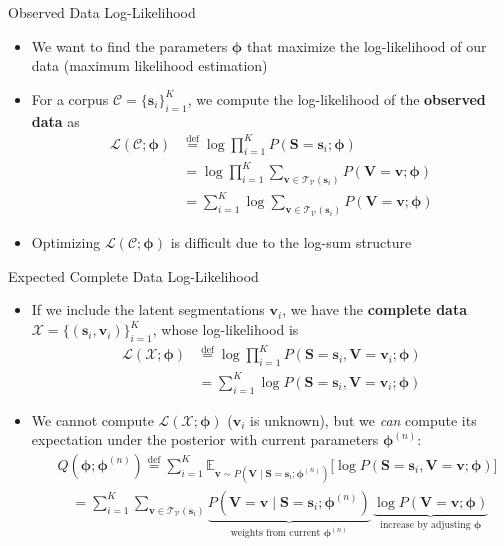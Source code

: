 \documentclass[11pt,compress,t,notes=noshow, xcolor=table]{beamer}
\newcommand{\vocab}{\mathcal{V}}
\newcommand{\probs}{\boldsymbol{\phi}}
\begin{document}
\begin{frame}{Observed Data Log-Likelihood}
\begin{itemize}
\item We want to find the parameters $\probs$ that maximize the log-likelihood of our data (maximum likelihood estimation)
\item For a corpus $\mathcal{C} = \{ \mathbf{s}_i \}_{i=1}^K$, we compute the log-likelihood of the \textbf{observed data} as
\begin{align*}
\mathcal{L}(\mathcal{C}; \probs) &\overset{\text{def}}{=} \log \prod_{i=1}^{K} P(\mathbf{S} = \mathbf{s}_i; \probs)\\
&= \log \prod_{i=1}^{K} \sum_{\mathbf{v} \in \mathcal{T}_{\vocab}(\mathbf{s}_i)} P(\mathbf{V} = \mathbf{v}; \probs)\\
&= \sum_{i=1}^{K} \log \sum_{\mathbf{v} \in \mathcal{T}_{\vocab}(\mathbf{s}_i)} P(\mathbf{V} = \mathbf{v}; \probs)
\end{align*}
\item Optimizing $\mathcal{L}(\mathcal{C}; \probs)$ is difficult due to the log-sum structure
\end{itemize}

\end{frame}


\begin{frame}{Expected Complete Data Log-Likelihood}

\vfill

\begin{itemize}
\item If we include the latent segmentations $\mathbf{v}_i$, we have the \textbf{complete data} $\mathcal{X} = \{(\mathbf{s}_i, \mathbf{v}_i)\}_{i=1}^K$, whose log-likelihood is
\begin{align*}
\mathcal{L}(\mathcal{X}; \probs) &\overset{\text{def}}{=} \log \prod_{i=1}^{K} P(\mathbf{S} = \mathbf{s}_i, \mathbf{V} = \mathbf{v}_i; \probs)\\
&= \sum_{i=1}^{K} \log P(\mathbf{S} = \mathbf{s}_i, \mathbf{V} = \mathbf{v}_i; \probs)
\end{align*}
\item We cannot compute $\mathcal{L}(\mathcal{X}; \probs)$ ($\mathbf{v}_i$ is unknown), but we \emph{can} compute its expectation under the posterior with current parameters $\probs^{(n)}$:
\begin{align*}
&Q(\probs; \probs^{(n)}) \overset{\text{def}}{=} \sum_{i=1}^{K} \mathbb{E}_{\mathbf{v} \sim P(\mathbf{V} \mid \mathbf{S} = \mathbf{s}_i; \probs^{(n)})}\big[\log P(\mathbf{S} = \mathbf{s}_i, \mathbf{V} = \mathbf{v}; \probs)\big]\\
&\quad = \sum_{i=1}^{K} \sum_{\mathbf{v} \in \mathcal{T}_{\vocab}(\mathbf{s}_i)} \underbrace{P(\mathbf{V} = \mathbf{v} \mid \mathbf{S} = \mathbf{s}_i; \probs^{(n)})}_{\text{weights from current } \probs^{(n)}} \, \underbrace{\log P(\mathbf{V} = \mathbf{v}; \probs)}_{\text{increase by adjusting } \probs}
\end{align*}
\end{itemize}

\vfill

\end{frame}
\end{document}

